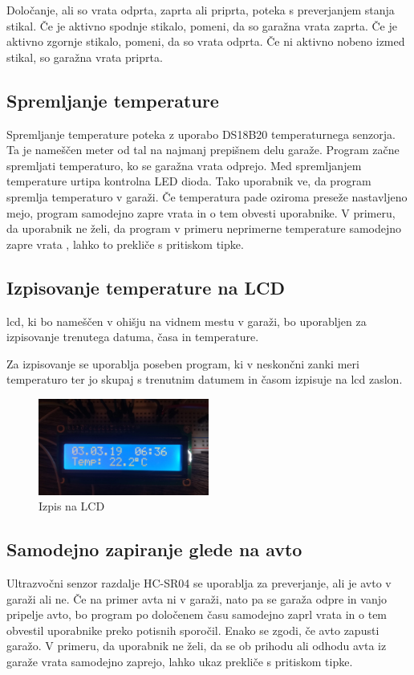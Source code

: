\documentclass[11pt]{article}
\begin{document}
Določanje, ali so vrata odprta, zaprta ali priprta, poteka s preverjanjem stanja stikal. Če je aktivno spodnje stikalo, pomeni, da so garažna vrata zaprta. Če je aktivno zgornje stikalo, pomeni, da so vrata odprta. Če ni aktivno nobeno izmed stikal, so garažna vrata priprta.

\subsection{Spremljanje temperature}
Spremljanje temperature poteka z uporabo DS18B20 temperaturnega senzorja. Ta je nameščen meter od tal na najmanj prepišnem delu garaže. Program začne spremljati temperaturo, ko se garažna vrata odprejo. Med spremljanjem temperature urtipa kontrolna LED dioda. Tako uporabnik ve, da program spremlja temperaturo v garaži. Če temperatura pade oziroma preseže nastavljeno mejo, program samodejno zapre vrata in o tem obvesti uporabnike. V primeru, da uporabnik ne želi, da program v primeru neprimerne temperature samodejno zapre vrata , lahko to prekliče s pritiskom tipke.

\subsection{Izpisovanje temperature na LCD}
\gls{lcd}, ki bo nameščen v ohišju na vidnem mestu v garaži, bo uporabljen za izpisovanje trenutega datuma, časa in temperature.

Za izpisovanje se uporablja poseben program, ki v neskončni zanki meri temperaturo ter jo skupaj s trenutnim datumem in časom izpisuje na \gls{lcd} zaslon.

\begin{figure}[h]
\centering
\includegraphics[width=0.5\textwidth]{images/LCD_temp.jpg}
\caption{Izpis na LCD}
\end{figure}

\subsection{Samodejno zapiranje glede na avto}
Ultrazvočni senzor razdalje HC-SR04 se uporablja za preverjanje, ali je avto v garaži ali ne. Če na primer avta ni v garaži, nato pa se garaža odpre in vanjo pripelje avto, bo program po določenem času samodejno zaprl vrata in o tem obvestil uporabnike preko potisnih sporočil. Enako se zgodi, če avto zapusti garažo. V primeru, da uporabnik ne želi, da se ob prihodu ali odhodu avta iz garaže vrata samodejno zaprejo, lahko ukaz prekliče s pritiskom tipke.
\end{document}
